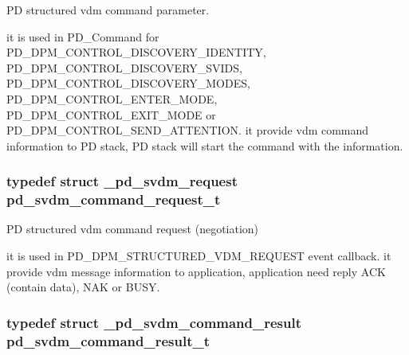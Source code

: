 P\-D structured vdm command parameter. 

it is used in P\-D\-\_\-\-Command for P\-D\-\_\-\-D\-P\-M\-\_\-\-C\-O\-N\-T\-R\-O\-L\-\_\-\-D\-I\-S\-C\-O\-V\-E\-R\-Y\-\_\-\-I\-D\-E\-N\-T\-I\-T\-Y, P\-D\-\_\-\-D\-P\-M\-\_\-\-C\-O\-N\-T\-R\-O\-L\-\_\-\-D\-I\-S\-C\-O\-V\-E\-R\-Y\-\_\-\-S\-V\-I\-D\-S, P\-D\-\_\-\-D\-P\-M\-\_\-\-C\-O\-N\-T\-R\-O\-L\-\_\-\-D\-I\-S\-C\-O\-V\-E\-R\-Y\-\_\-\-M\-O\-D\-E\-S, P\-D\-\_\-\-D\-P\-M\-\_\-\-C\-O\-N\-T\-R\-O\-L\-\_\-\-E\-N\-T\-E\-R\-\_\-\-M\-O\-D\-E, P\-D\-\_\-\-D\-P\-M\-\_\-\-C\-O\-N\-T\-R\-O\-L\-\_\-\-E\-X\-I\-T\-\_\-\-M\-O\-D\-E or P\-D\-\_\-\-D\-P\-M\-\_\-\-C\-O\-N\-T\-R\-O\-L\-\_\-\-S\-E\-N\-D\-\_\-\-A\-T\-T\-E\-N\-T\-I\-O\-N. it provide vdm command information to P\-D stack, P\-D stack will start the command with the information. \hypertarget{group__usb__pd__stack_ga7861c86d4d4511f1621b379cf24fe7c9}{
\subsubsection[{pd\-\_\-svdm\-\_\-command\-\_\-request\-\_\-t}]{\setlength{\rightskip}{0pt plus 5cm}typedef struct {\bf \-\_\-pd\-\_\-svdm\-\_\-request}  {\bf pd\-\_\-svdm\-\_\-command\-\_\-request\-\_\-t}}}\label{group__usb__pd__stack_ga7861c86d4d4511f1621b379cf24fe7c9}


P\-D structured vdm command request (negotiation) 

it is used in P\-D\-\_\-\-D\-P\-M\-\_\-\-S\-T\-R\-U\-C\-T\-U\-R\-E\-D\-\_\-\-V\-D\-M\-\_\-\-R\-E\-Q\-U\-E\-S\-T event callback. it provide vdm message information to application, application need reply A\-C\-K (contain data), N\-A\-K or B\-U\-S\-Y. \hypertarget{group__usb__pd__stack_ga89d37a53049e623f39d331b518280fbf}{
\subsubsection[{pd\-\_\-svdm\-\_\-command\-\_\-result\-\_\-t}]{\setlength{\rightskip}{0pt plus 5cm}typedef struct {\bf \-\_\-pd\-\_\-svdm\-\_\-command\-\_\-result}  {\bf pd\-\_\-svdm\-\_\-command\-\_\-result\-\_\-t}}}\label{group__usb__pd__stack_ga89d37a53049e623f39d331b518280fbf}


